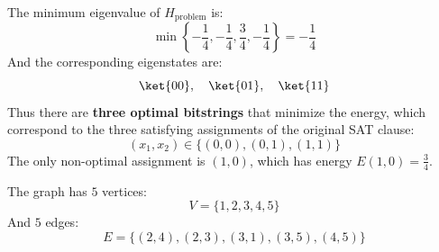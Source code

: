 \highspace
{} The minimum eigenvalue of $H_{\text{problem}}$ is:
\begin{equation*}
    \min\left\{-\frac{1}{4}, -\frac{1}{4}, \frac{3}{4}, -\frac{1}{4}\right\} = -\frac{1}{4}
\end{equation*}
And the corresponding eigenstates are:
\begin{equation*}
    \ket{00}, \quad \ket{01}, \quad \ket{11}
\end{equation*}
Thus there are \textbf{three optimal bitstrings} that minimize the energy, which correspond to the three satisfying assignments of the original SAT clause:
\begin{equation*}
    (x_1, x_2) \in \{(0,0), (0,1), (1,1)\}
\end{equation*}
The only non-optimal assignment is $(1,0)$, which has energy $E(1,0) = \frac{3}{4}$.

\newpage

{}
\noindent
{} The graph has $5$ vertices:
\begin{equation*}
    V = \{1,2,3,4,5\}
\end{equation*}
And $5$ edges:
\begin{equation*}
    E = \{(2,4), (2,3), (3,1), (3,5), (4,5)\}
\end{equation*}

